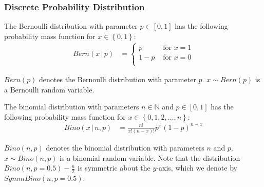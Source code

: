 \subsubsection{Discrete Probability Distribution}
\label{subsubsec:DiscreteProbabilityDistribution}

\begin{definition}
    \label{def:BernoulliDistribution}
    The Bernoulli distribution with parameter $p \in \left[0,1\right] $ has the following probability mass function for $x\in \left\{0,1\right\}  $:
    \begin{equation}
        \begin{split}
            Bern\left(x \,|\,p \right)&=
            \begin{cases}
                p   & \text{ for } x =1 \\
                1-p & \text{ for } x =0 \\
            \end{cases}
        \end{split}
    \end{equation}
\end{definition}
$Bern\left(p \right)$ denotes the Bernoulli distribution with parameter $p  $.
$x \sim Bern\left( p \right)$ is a Bernoulli random variable.


\begin{definition}
    \label{def:BinomialDistribution}
    The binomial distribution with parameters $n \in \mathbb{N} $ and $p \in \left[0,1\right] $ has the following probability mass function for $x \in \left\{0,1,2, \ldots ,n\right\} $:
    \begin{equation}
        \begin{split}
            Bino\left( x \,|\,n,p \right)&=\frac{n!}{x!\left(n-x\right)! }p^x\left(1-p\right) ^{n-x}
        \end{split}
    \end{equation}
\end{definition}
$Bino\left(n,p \right)$ denotes the binomial distribution with parameters $n  $ and $p  $.
$x \sim Bino\left( n,p \right)$ is a binomial random variable. Note that the distribution $Bino\left(n,p=0.5 \right)-\frac{n}{2}$ is symmetric about the $y$-axis, which we denote by $SymmBino\left(n,p=0.5 \right)$.



